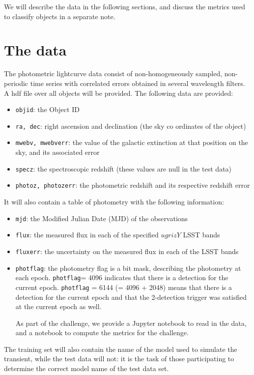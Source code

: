 \documentclass[\docopts]{\docclass}
\begin{document}
We will describe the data in the following sections, and discuss the metrics used to classify objects in a separate note.
\section{The data}
\label{sec:thedata}

The photometric lightcurve data consist of non-homogeneously sampled, non-periodic time series with correlated errors obtained in several wavelength filters.
A hdf file over all objects will be provided. The following data are provided:

\begin{itemize}
\item {\tt objid}: the Object ID
\item {\tt ra, dec}: right ascension and declination (the sky co ordinates of the object)
\item {\tt mwebv, mwebverr}: the value of the galactic extinction at that position on the sky, and its associated error
\item {\tt specz}: the spectroscopic redshift (these values are null in the test data)
\item {\tt photoz, photozerr}: the photometric redshift and its respective redshift error 
\end{itemize}

It will also contain a table of photometry with the following information:
\begin{itemize}
\item {\tt mjd}: the Modified Julian Date (MJD) of the observations
\item {\tt flux}: the measured flux in each of the specified $ugrizY$ LSST bands
\item {\tt fluxerr}: the uncertainty on the measured flux in each of the LSST bands
\item {\tt photflag}: the photometry flag is a bit mask, describing the photometry at each epoch. {\tt photflag}= 4096 indicates that there is a detection for the current epoch. {\tt photflag} = 6144 (= 4096 + 2048) means that there is a detection for the current epoch and that the 2-detection trigger was satisfied at the current epoch as well.

\clearpage
As part of the challenge, we provide a Jupyter notebook to read in the data, and a notebook to compute the metrics for the challenge.
\end{itemize}

The training set will also contain the name of the model used to simulate the transient, while the test data will not: it is the task of those participating to determine the correct model name of the test data set.
\end{document}
